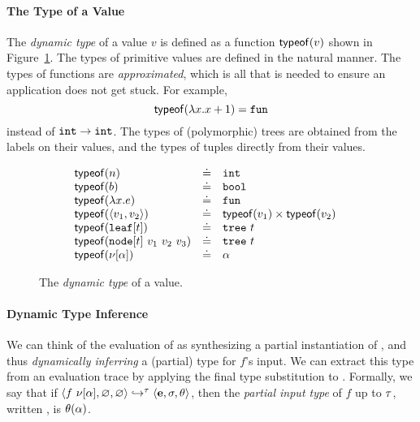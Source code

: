 \paragraph{The Type of a Value} The \emph{dynamic type}
of a value $v$ is defined as a function $\mathsf{typeof}(v)$ shown
in Figure~\ref{fig:typeof}.
%
The types of primitive values are defined in the natural manner.
%
The types of functions are \emph{approximated}, which is all
that is needed to ensure an application does not get stuck.
%
For example,
$$\mathsf{typeof}(\lambda x. x + 1) = \mathtt{fun}$$
instead of $\mathtt{int} \rightarrow \mathtt{int}$.
%
The types of (polymorphic) trees are obtained from the labels on their
values, and the types of tuples directly from their values.

\begin{figure}[t]
\[ \begin{array}{lcll}
    \mathsf{typeof}(n)   & \doteq & \mathtt{int} & \\
    \mathsf{typeof}(b)   & \doteq & \mathtt{bool} & \\
    \mathsf{typeof}(\lambda x. e) & \doteq & \mathtt{fun} \\
    \mathsf{typeof}(\langle v_1, v_2 \rangle) & \doteq & \mathsf{typeof}(v_1) \times \mathsf{typeof}(v_2) \\
    \mathsf{typeof}(\mathtt{leaf}[t]) & \doteq & \mathtt{tree}\ t \\
    \mathsf{typeof}(\mathtt{node}[t]\ v_1\ v_2\ v_3) & \doteq & \mathtt{tree}\ t \\
    \mathsf{typeof}(\nu[\alpha]) & \doteq & \alpha \\
  \end{array} \]
\caption{The \emph{dynamic type} of a value.}
\label{fig:typeof}
\end{figure}

\paragraph{Dynamic Type Inference}
We can think of the evaluation of 
as synthesizing a partial instantiation of \thole, and thus
\emph{dynamically inferring} a (partial) type for $f$'s input.
%
We can extract this type from an evaluation trace by
applying the final type substitution to \thole.
%
Formally, we say that if
$\langle f\ \nu[\alpha], \varnothing, \varnothing \rangle \hookrightarrow^{\tau} \langle \mathbf{e}, \sigma, \theta \rangle$,
then the \emph{partial input type} of $f$ up to $\tau$, written
, is $\theta(\alpha)$.

